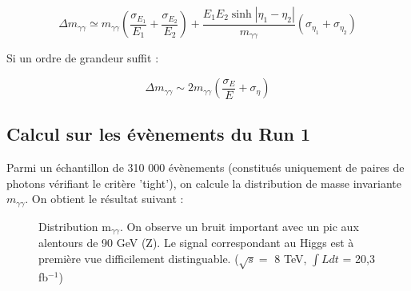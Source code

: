 \documentclass[11pt]{article} %
\begin{document}
\begin{equation}
\Delta m_{\gamma\gamma} \simeq m_{\gamma \gamma}\left( \dfrac{\sigma_{E_1}}{E_1} +  \dfrac{\sigma_{E_2}}{E_2}\right) + \dfrac{E_1E_2 \sinh {|\eta_1 - \eta_2|}}{m_{\gamma \gamma}} \left( \sigma_{\eta_1} + \sigma_{\eta_2} \right)
\end{equation}

Si un ordre de grandeur suffit :

\begin{equation}
\Delta m_{\gamma\gamma} \sim 2m_{\gamma \gamma}\left ( \dfrac{\sigma_E}{E} +  \sigma_{\eta} \right )
\end{equation}

\subsection{Calcul sur les évènements du Run 1}

Parmi un échantillon de 310 000 évènements (constitués uniquement de paires de photons vérifiant le critère 'tight'), on calcule la distribution de masse invariante $m_{\gamma \gamma}$. On obtient le résultat suivant :

\begin{figure}[H]
\centering
  \caption{Distribution m$_{\gamma \gamma}$. On observe un bruit important avec un pic aux alentours de 90 GeV (Z). Le signal correspondant au Higgs est à première vue difficilement distinguable. ($\sqrt{s} =$ 8 TeV,  $\int L dt$ = 20,3 fb$^{-1}$) }
 \resizebox{.9\linewidth}{!}{}
\end{figure}
\end{document}
